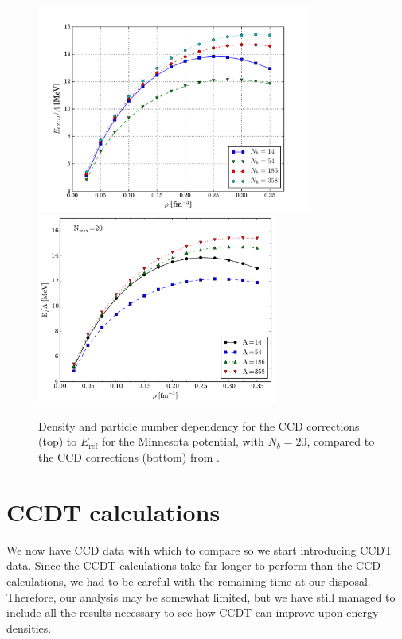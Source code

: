 \documentclass[10pt,twoside]{report}
\begin{document}
	\begin{figure}
		\centering
		\captionsetup{width=.8\textwidth}
		\hspace{0.35cm}
		\includegraphics[width=0.81\textwidth]{Figures/density_for_MP.pdf}
		\includegraphics[width=0.7\textwidth]{Figures/nucl_comp_density_for_MP.pdf}
		\caption{Density and particle number dependency for the CCD corrections (top) to $E_{\text{ref}}$ for the Minnesota potential, with $N_b=20$, compared to the CCD corrections (bottom) from \cite{HJensenLombardoKolck16}.}
		\label{Implementation | fig | "density for MP"}
	\end{figure}
	\newpage
	
	\section{CCDT calculations}
	We now have CCD data with which to compare so we start introducing CCDT data. Since the CCDT calculations take far longer to perform than the CCD calculations, we had to be careful with the remaining time at our disposal. Therefore, our analysis may be somewhat limited, but we have still managed to include all the results necessary to see how CCDT can improve upon energy densities.\\
	
\end{document}
